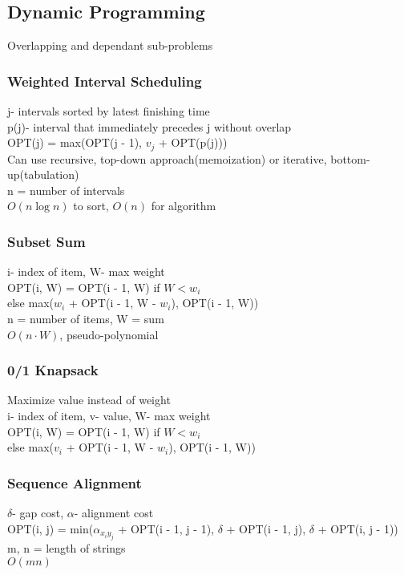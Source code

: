 \documentclass{article}
\begin{document}
\begin{multicols*}{2}
        \subsection*{Dynamic Programming}
        Overlapping and dependant sub-problems
        \subsubsection*{Weighted Interval Scheduling}
        j- intervals sorted by latest finishing time\\
        p(j)- interval that immediately precedes j without overlap\\
        OPT(j) = max(OPT(j - 1), $v_j$ + OPT(p(j)))\\
        Can use recursive, top-down approach(memoization) or iterative, bottom-up(tabulation)\\
        n = number of intervals\\
        $O(n\log n)$ to sort, $O(n)$ for algorithm
        \subsubsection*{Subset Sum}
        i- index of item, W- max weight\\
        OPT(i, W) = OPT(i - 1, W) if $W < w_i$\\
        else max($w_i$ + OPT(i - 1, W - $w_i$), OPT(i - 1, W))\\
        n = number of items, W = sum\\
        $O(n \cdot W)$, pseudo-polynomial
        \subsubsection*{0/1 Knapsack}
        Maximize value instead of weight\\
        i- index of item, v- value, W- max weight\\
        OPT(i, W) = OPT(i - 1, W) if $W < w_i$\\
        else max($v_i$ + OPT(i - 1, W - $w_i$), OPT(i - 1, W))
        \subsubsection*{Sequence Alignment}
        $\delta$- gap cost, $\alpha$- alignment cost\\
        OPT(i, j) = min($\alpha_{x_iy_j}$ + OPT(i - 1, j - 1),
        $\delta$ + OPT(i - 1, j), $\delta$ + OPT(i, j - 1))\\
        m, n = length of strings\\
        $O(mn)$

\end{multicols*}
\end{document}
